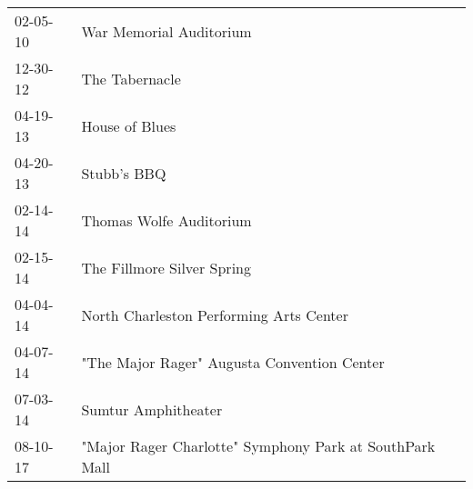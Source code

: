 \begin{supertabular}{p{0.07\textwidth}p{0.23\textwidth}}
 02-05-10 &                                  War Memorial Auditorium \\
 12-30-12 &                                           The Tabernacle \\
 04-19-13 &                                           House of Blues \\
 04-20-13 &                                              Stubb's BBQ \\
 02-14-14 &                                  Thomas Wolfe Auditorium \\
 02-15-14 &                               The Fillmore Silver Spring \\
 04-04-14 &                  North Charleston Performing Arts Center \\
 04-07-14 &              "The Major Rager" Augusta Convention Center \\
 07-03-14 &                                      Sumtur Amphitheater \\
 08-10-17 &  "Major Rager Charlotte" Symphony Park at SouthPark Mall \\
\end{supertabular}
